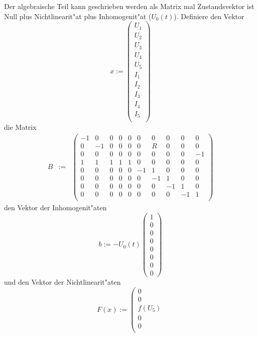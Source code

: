 {%
Der algebraische Teil kann geschrieben werden als Matrix mal Zustandsvektor ist Null plus Nichtlinearit"at plus Inhomogenit"at ($U_0(t)$). Definiere den Vektor
$$
x  :=  \left(
\begin{array}{c}
U_1\\
U_2\\
U_3\\
U_4\\
U_5\\
I_1\\
I_2\\
I_3\\
I_4\\
I_5\\
\end{array}
\right)
$$
die Matrix
\begin{eqnarray*}
B & := & \left(
\begin{array}{ccccc|ccccc}
-1 & 0 & 0 & 0 & 0 &    0 & 0 & 0 & 0 & 0\\
0 & -1 & 0 & 0 & 0 &    0 & R & 0 & 0 & 0\\
0 &  0 & 0 & 0 & 0 &    0 & 0 & 0 & 0 & -1\\
1 &  1 & 1 & 1 & 1 &    0 & 0 & 0 & 0 & 0\\
0 &  0 & 0 & 0 & 0 &    -1 & 1 & 0 & 0 & 0\\
0 &  0 & 0 & 0 & 0 &    0 & -1 & 1 & 0 & 0\\
0 &  0 & 0 & 0 & 0 &    0 & 0 & -1 & 1 & 0\\
0 &  0 & 0 & 0 & 0 &    0 & 0 & 0 & -1 & 1\\
\end{array}
\right)
\end{eqnarray*}
den Vektor der Inhomogenit"aten
$$ 
b  := -U_0(t) \left(
\begin{array}{c}
1\\
0\\
0\\
0\\
0\\
0\\
0\\
0
\end{array}
\right)
$$
und den Vektor der Nichtlinearit"aten
$$ 
F(x)  := \left(
\begin{array}{c}
0\\
0\\
f(U_5)\\
0\\
0\\

\end{array}$$}
